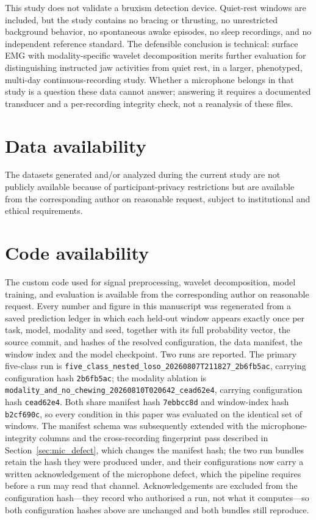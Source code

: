 \documentclass[pdflatex,sn-nature,iicol]{sn-jnl}
\begin{document}
This study does not validate a bruxism detection device. Quiet-rest windows are included, but the study contains no bracing or thrusting, no unrestricted background behavior, no spontaneous awake episodes, no sleep recordings, and no independent reference standard. The defensible conclusion is technical: surface EMG with modality-specific wavelet decomposition merits further evaluation for distinguishing instructed jaw activities from quiet rest, in a larger, phenotyped, multi-day continuous-recording study. Whether a microphone belongs in that study is a question these data cannot answer; answering it requires a documented transducer and a per-recording integrity check, not a reanalysis of these files.

\backmatter

\section*{Data availability}
The datasets generated and/or analyzed during the current study are not publicly available because of participant-privacy restrictions but are available from the corresponding author on reasonable request, subject to institutional and ethical requirements.

\section*{Code availability}
The custom code used for signal preprocessing, wavelet decomposition, model training, and evaluation is available from the corresponding author on reasonable request. Every number and figure in this manuscript was regenerated from a saved prediction ledger in which each held-out window appears exactly once per task, model, modality and seed, together with its full probability vector, the source commit, and hashes of the resolved configuration, the data manifest, the window index and the model checkpoint. Two runs are reported. The primary five-class run is \texttt{five\_class\_nested\_loso\_}\allowbreak\texttt{20260807T211827\_2b6fb5ac}, carrying configuration hash \texttt{2b6fb5ac}; the modality ablation is \texttt{modality\_and\_no\_chewing\_}\allowbreak\texttt{20260810T020642\_cead62e4}, carrying configuration hash \texttt{cead62e4}. Both share manifest hash \texttt{7ebbcc8d} and window-index hash \texttt{b2cf690c}, so every condition in this paper was evaluated on the identical set of windows. The manifest schema was subsequently extended with the microphone-integrity columns and the cross-recording fingerprint pass described in Section~\ref{sec:mic_defect}, which changes the manifest hash; the two run bundles retain the hash they were produced under, and their configurations now carry a written acknowledgement of the microphone defect, which the pipeline requires before a run may read that channel. Acknowledgements are excluded from the configuration hash---they record who authorised a run, not what it computes---so both configuration hashes above are unchanged and both bundles still reproduce.
\end{document}
